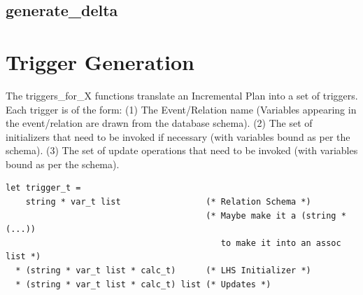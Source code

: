 \documentclass[11pt]{amsart}
\begin{document}
\subsection{generate\_delta}
\begin{algorithmic}
   
\ENDIF

\end{algorithmic}

\section{Trigger Generation}

The triggers\_for\_X functions translate an Incremental Plan into a set of triggers.  Each trigger is of the form: (1) The Event/Relation name (Variables appearing in the event/relation are drawn from the database schema).  (2) The set of initializers that need to be invoked if necessary (with variables bound as per the schema).  (3) The set of update operations that need to be invoked (with variables bound as per the schema).

\begin{verbatim}
let trigger_t = 
    string * var_t list                 (* Relation Schema *)
                                        (* Maybe make it a (string * (...))
                                           to make it into an assoc list *)
  * (string * var_t list * calc_t)      (* LHS Initializer *)
  * (string * var_t list * calc_t) list (* Updates *)
\end{verbatim}
\end{document}
